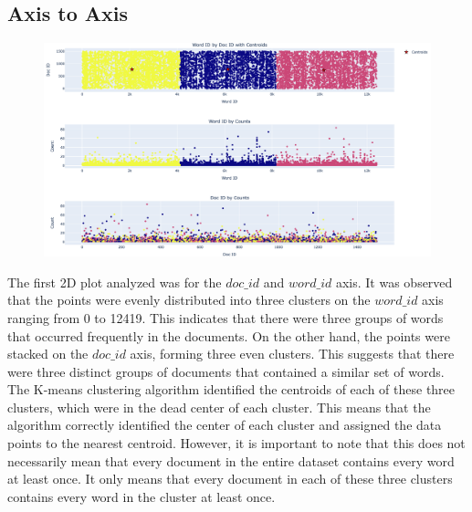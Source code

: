 \documentclass{article}
\begin{document}
\subsection{Axis to Axis}

\begin{figure}[h]
    \centering
    \includegraphics[width=1\textwidth]{figs/3plots.png}
\end{figure}
The first 2D plot analyzed was for the $doc\_id$ and $word\_id$ axis. It was observed that the points were evenly distributed into three clusters on the $word\_id$ axis ranging from 0 to 12419. This indicates that there were three groups of words that occurred frequently in the documents. On the other hand, the points were stacked on the $doc\_id$ axis, forming three even clusters. This suggests that there were three distinct groups of documents that contained a similar set of words. The K-means clustering algorithm identified the centroids of each of these three clusters, which were in the dead center of each cluster. This means that the algorithm correctly identified the center of each cluster and assigned the data points to the nearest centroid. However, it is important to note that this does not necessarily mean that every document in the entire dataset contains every word at least once. It only means that every document in each of these three clusters contains every word in the cluster at least once.

\end{document}
